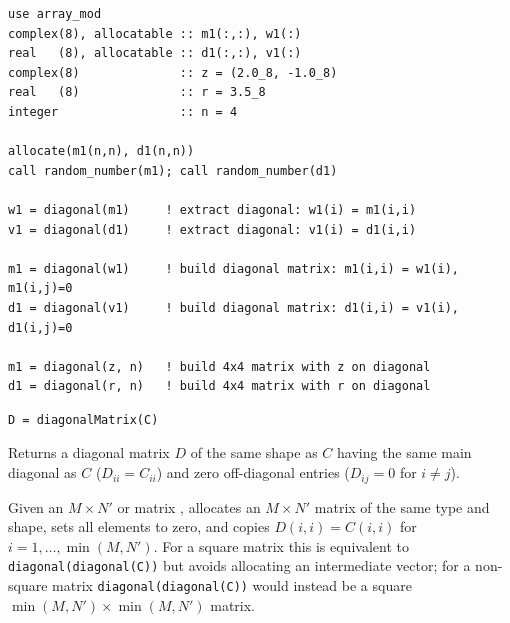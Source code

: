 \lstset{language=[95]Fortran}
\begin{lstlisting}
use array_mod
complex(8), allocatable :: m1(:,:), w1(:)
real   (8), allocatable :: d1(:,:), v1(:)
complex(8)              :: z = (2.0_8, -1.0_8)
real   (8)              :: r = 3.5_8
integer                 :: n = 4

allocate(m1(n,n), d1(n,n))
call random_number(m1); call random_number(d1)

w1 = diagonal(m1)     ! extract diagonal: w1(i) = m1(i,i)
v1 = diagonal(d1)     ! extract diagonal: v1(i) = d1(i,i)

m1 = diagonal(w1)     ! build diagonal matrix: m1(i,i) = w1(i), m1(i,j)=0
d1 = diagonal(v1)     ! build diagonal matrix: d1(i,i) = v1(i), d1(i,j)=0

m1 = diagonal(z, n)   ! build 4x4 matrix with z on diagonal
d1 = diagonal(r, n)   ! build 4x4 matrix with r on diagonal
\end{lstlisting}


\lstset{language=[95]Fortran}
\begin{lstlisting}
D = diagonalMatrix(C)
\end{lstlisting}

Returns a diagonal matrix $D$ of the same shape as $C$ having the same main diagonal as $C$ ($D_{ii} = C_{ii}$) and zero off-diagonal entries ($D_{ij} = 0$ for $i\neq j$).

Given an $M\times N'$  or  matrix ,  allocates an $M\times N'$ matrix  of the same type and shape, sets all elements to zero, and copies $D(i,i) = C(i,i)$ for $i=1,\ldots,\min(M,N')$. For a square matrix this is equivalent to \texttt{diagonal(diagonal(C))} but avoids allocating an intermediate vector; for a non-square matrix \texttt{diagonal(diagonal(C))} would instead be a square $\min(M,N')\times\min(M,N')$ matrix.

\begin{description}[leftmargin=2.2cm, style=nextline]
\end{description}

